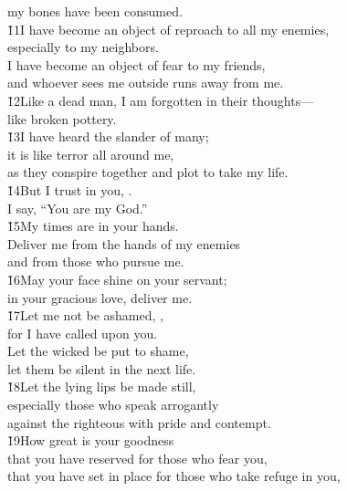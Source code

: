 \begin{poetry}
\poemll    my bones have been consumed. \\
\poeml \v{11}I have become an object of reproach to all my enemies, \\
\poemll    especially to my neighbors. \\
\poeml I have become an object of fear to my friends, \\
\poemll    and whoever sees me outside runs away from me. \\
\poeml \v{12}Like a dead man, I am forgotten in their thoughts--- \\
\poemll    like broken pottery. \\
\poeml \v{13}I have heard the slander of many; \\
\poemll    it is like terror all around me, \\
\poemlll       as they conspire together and plot to take my life. \\
\poeml \v{14}But I trust in you, . \\
\poemll    I say, ``You are my God.'' \\
\poeml \v{15}My times are in your hands. \\
\poemll    Deliver me from the hands of my enemies \\
\poemlll       and from those who pursue me. \\
\poeml \v{16}May your face shine on your servant; \\
\poemll    in your gracious love, deliver me. \\
\poeml \v{17}Let me not be ashamed, , \\
\poemll    for I have called upon you. \\
\poeml Let the wicked be put to shame, \\
\poemll    let them be silent in the next life. \\
\poeml \v{18}Let the lying lips be made still, \\
\poemll    especially those who speak arrogantly \\
\poemlll       against the righteous with pride and contempt. \\
\poeml \v{19}How great is your goodness \\
\poemll    that you have reserved for those who fear you, \\
\poeml that you have set in place for those who take refuge in you, \\

\end{poetry}
